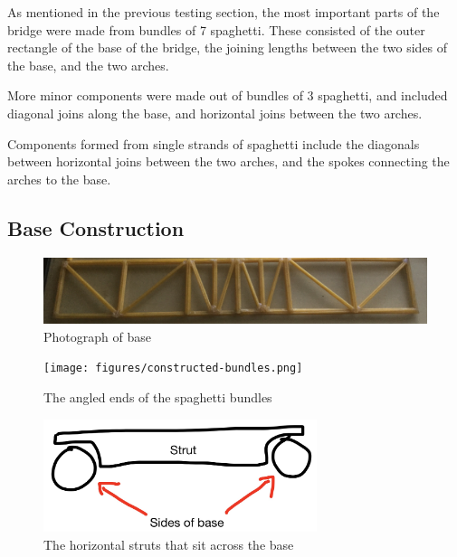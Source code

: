 \documentclass[a4paper,11pt]{article}
\begin{document}
As mentioned in the previous testing section, the most important parts of the
bridge were made from bundles of 7 spaghetti.
These consisted of the outer rectangle of the base of the bridge, the joining
lengths between the two sides of the base, and the two arches.

More minor components were made out of bundles of 3 spaghetti, and
included diagonal joins along the base, and horizontal joins between the two
arches.

Components formed from single strands of spaghetti include the diagonals between
horizontal joins between the two arches, and the spokes connecting the arches to
the base.


\subsection{Base Construction}

\begin{figure}
\begin{center}
\includegraphics[width=\textwidth]{figures/base.png}
\end{center}
\caption{Photograph of base}
\label{construction:base}
\end{figure}

\begin{figure}
\begin{center}
\texttt{[image: figures/constructed-bundles.png]}
\end{center}
\caption{The angled ends of the spaghetti bundles}
\label{construction:bundles}
\end{figure}

\begin{figure}
\begin{center}
\includegraphics[width=8cm]{figures/struts.png}
\end{center}
\caption{The horizontal struts that sit across the base}
\label{construction:struts}
\end{figure}
\end{document}
